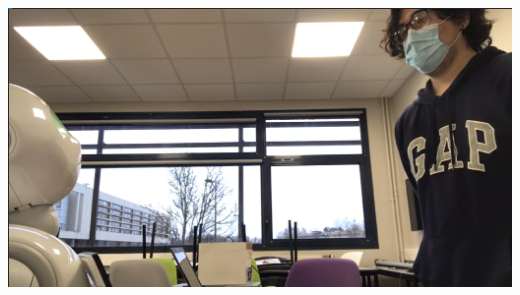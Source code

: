 \documentclass{cubeamer}
\begin{document}
\begin{frame}
	\includegraphics[width = \textwidth]{img/portada.png}
\end{frame}
\end{document}

